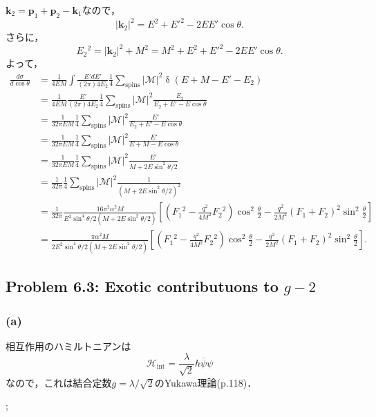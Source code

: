 $\boldsymbol{k}_2 = \boldsymbol{p}_1 + \boldsymbol{p}_2 - \boldsymbol{k}_1$なので，
\[ \lvert\boldsymbol{k}_2\rvert^2 = E^2 +E'^2 - 2EE'\cos\theta . \]
さらに，
\[ E_2{}^2 = \lvert\boldsymbol{k}_2\rvert^2 + M^2 = M ^2 + E^2 +E'^2 - 2EE'\cos\theta . \]
よって，
\begin{align*}
  \frac{d\sigma}{d\cos\theta} &= \frac{1}{4EM} \int \frac{E' dE'}{(2\pi) 4 E_2} \frac{1}{4}\sum_\text{spins}\lvert\mathcal{M}\rvert^2 \mathop\delta (E + M - E' - E_2) \\
  &= \frac{1}{4EM} \frac{E'}{(2\pi) 4 E_2} \frac{1}{4}\sum_\text{spins}\lvert\mathcal{M}\rvert^2 \frac{E_2}{E_2 + E' - E\cos\theta} \\
  &= \frac{1}{32\pi EM} \frac{1}{4}\sum_\text{spins}\lvert\mathcal{M}\rvert^2 \frac{E'}{E_2 + E' - E\cos\theta} \\
  &= \frac{1}{32\pi EM} \frac{1}{4}\sum_\text{spins}\lvert\mathcal{M}\rvert^2 \frac{E'}{E + M - E\cos\theta} \\
  &= \frac{1}{32\pi EM} \frac{1}{4}\sum_\text{spins}\lvert\mathcal{M}\rvert^2 \frac{E'}{M + 2E \sin^2\theta/2} \\
  &= \frac{1}{32\pi} \frac{1}{4}\sum_\text{spins}\lvert\mathcal{M}\rvert^2 \frac{1}{(M + 2E \sin^2\theta/2)^2} \\
  &= \frac{1}{32\pi} \frac{16\pi^2 \alpha^2 M}{E^2 \sin^4\theta/2(M + 2E\sin^2\theta/2)}
  \left[ \left( F_1{}^2 - \frac{q^2}{4M^2} F_2{}^2 \right) \cos^2 \frac{\theta}{2} - \frac{q^2}{2M^2} (F_1 + F_2)^2 \sin^2 \frac{\theta}{2} \right] \\
  &= \frac{\pi \alpha^2 M}{2E^2 \sin^4\theta/2(M + 2E\sin^2\theta/2)}
  \left[ \left( F_1{}^2 - \frac{q^2}{4M^2} F_2{}^2 \right) \cos^2 \frac{\theta}{2} - \frac{q^2}{2M^2} (F_1 + F_2)^2 \sin^2 \frac{\theta}{2} \right] .
\end{align*}

\subsection{Problem 6.3: Exotic contributuons to $g-2$}
\subsubsection{(a)}
相互作用のハミルトニアンは
\[ \mathcal{H}_\text{int} = \frac{\lambda}{\sqrt{2}} h \overline\psi \psi \]
なので，これは結合定数$g = \lambda/\sqrt{2}$のYukawa理論(p.118)．

\begin{center}
  ;
\end{center}

